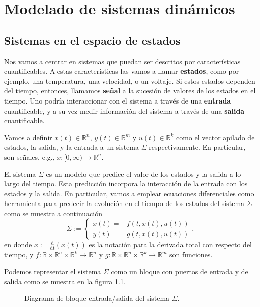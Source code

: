 \chapter{Modelado de sistemas dinámicos}

\section{Sistemas en el espacio de estados}
Nos vamos a centrar en sistemas que puedan ser descritos por características cuantificables. A estas características las vamos a llamar {\bf estados}, como por ejemplo, una temperatura, una velocidad, o un voltaje. Si estos estados dependen del tiempo, entonces, llamamos {\bf señal} a la sucesión de valores de los estados en el tiempo. Uno podría interaccionar con el sistema a través de una {\bf entrada} cuantificable, y a su vez medir información del sistema a través de una {\bf salida} cuantificable.

Vamos a definir $x(t)\in\mathbb{R}^n$, $y(t)\in\mathbb{R}^m$ y $u(t)\in\mathbb{R}^k$ como el vector apilado de estados, la salida, y la entrada a un sistema $\Sigma$ respectivamente. En particular, son señales, e.g., $x :[0,\infty) \to \mathbb{R}^n$.

El sistema $\Sigma$ es un modelo que predice el valor de los estados y la salida a lo largo del tiempo. Esta predicción incorpora la interacción de la entrada con los estados y la salida. En particular, vamos a emplear ecuaciones diferenciales como herramienta para predecir la evolución en el tiempo de los estados del sistema $\Sigma$ como se muestra a continuación
\begin{equation}
	\Sigma := \begin{cases}
		\dot x(t) =& f(t,x(t),u(t)) \\ y(t) =& g(t,x(t),u(t))
	\end{cases}, 
\label{eq: sigma}
\end{equation}
en donde $\dot x := \frac{\mathrm{d}}{\mathrm{dt}}(x(t))$ es la notación para la derivada total con respecto del tiempo, y $f:\mathbb{R} \times \mathbb{R}^n \times \mathbb{R}^k \to \mathbb{R}^n$ y $g: \mathbb{R} \times \mathbb{R}^n \times \mathbb{R}^k \to \mathbb{R}^m$ son funciones.

Podemos representar el sistema $\Sigma$ como un bloque con puertos de entrada y de salida como se muestra en la figura \ref{fig: sigma}.

\begin{figure}[!h]
\centering
{}
	\caption{Diagrama de bloque entrada/salida del sistema $\Sigma$.}
	\label{fig: sigma}
\end{figure}

